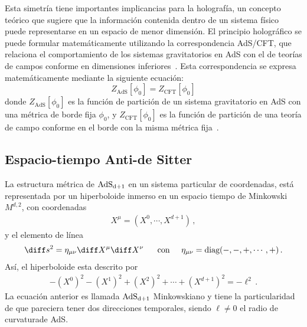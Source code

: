\documentclass[../Main.tex]{subfiles}
\begin{document}
Esta simetría tiene importantes implicancias para la holografía, un concepto teórico que sugiere que la información contenida dentro de un sistema físico puede representarse en un espacio de menor dimensión. El principio holográfico se puede formular matemáticamente utilizando la correspondencia AdS/CFT, que relaciona el comportamiento de los sistemas gravitatorios en AdS con el de teorías de campos conforme en dimensiones inferiores~\cite{witten1998anti}. Esta correspondencia se expresa matemáticamente mediante la siguiente ecuación:
\begin{equation}
Z_{\text{AdS}}[\phi_{0}] = Z_{\text{CFT}}[\phi_{0}]
\end{equation}
donde $Z_{\text{AdS}}[\phi_{0}]$ es la función de partición de un sistema gravitatorio en AdS con una métrica de borde fija $\phi_{0}$, y $Z_{\text{CFT}}[\phi_{0}]$ es la función de partición de una teoría de campo conforme en el borde con la misma métrica fija~\cite{maldacena1999large}.

\subsection{Espacio-tiempo Anti-de Sitter}

La estructura métrica de $\rm AdS_{d+1}$ en un sistema particular de coordenadas, está representada por un hiperboloide inmerso en un espacio tiempo de Minkowski $M^{d,2}$, con coordenadas
\begin{align}
    X^{\mu}=(X^{0},\cdots,X^{d+1})\, ,
\end{align}
y el elemento de línea 
\begin{align}
    \diff s^2=\eta_{\mu\nu}\diff X^{\mu}\diff X^{\nu} \;\;\;\;\;\; \mbox{con} \;\;\;\;\; \eta_{\mu\nu}=\rm diag(-,-,+,\cdots,+)\, . \label{adsline}
\end{align}
Así, el hiperboloide esta descrito por
\begin{align}
    -(X^{0})^2-(X^{1})^2+(X^{2})^2+\cdots+(X^{d+1})^2=-\ell^2 \, . \label{ads1}
\end{align}
La ecuación anterior es llamada $\rm AdS_{d+1}$ Minkowskiano y tiene la particularidad de que pareciera tener dos direcciones temporales, siendo $\ell\neq 0$ el radio de curvaturade AdS. 
\end{document}
